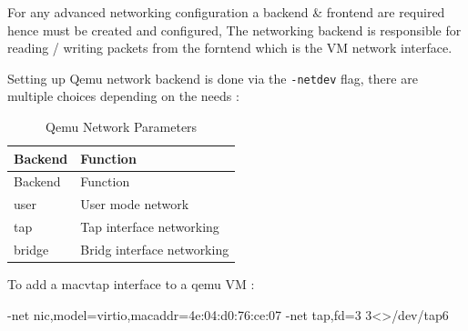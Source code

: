 \documentclass[
  14pt,
  english,
  a4paper,
]{scrreprt}
\newenvironment{Shaded}{}{}
\newcommand{\ExtensionTok}[1]{#1}
\newcommand{\NormalTok}[1]{#1}
\newcommand{\OperatorTok}[1]{\textcolor[rgb]{0.40,0.40,0.40}{#1}}
\begin{document}
For any advanced networking configuration a backend \& frontend are
required hence must be created and configured, The networking backend is
responsible for reading / writing packets from the forntend which is the
VM network interface.

Setting up Qemu network backend is done via the \texttt{-netdev} flag,
there are multiple choices depending on the needs :

\hypertarget{tbl:qemu_net_param}{}
\begin{longtable}[]{@{}ll@{}}
\caption{\label{tbl:qemu_net_param}Qemu Network
Parameters}\tabularnewline
\toprule
\begin{minipage}[b]{0.13\columnwidth}\raggedright
Backend\strut
\end{minipage} & \begin{minipage}[b]{0.38\columnwidth}\raggedright
Function\strut
\end{minipage}\tabularnewline
\midrule
\endfirsthead
\toprule
\begin{minipage}[b]{0.13\columnwidth}\raggedright
Backend\strut
\end{minipage} & \begin{minipage}[b]{0.38\columnwidth}\raggedright
Function\strut
\end{minipage}\tabularnewline
\midrule
\endhead
\begin{minipage}[t]{0.13\columnwidth}\raggedright
user\strut
\end{minipage} & \begin{minipage}[t]{0.38\columnwidth}\raggedright
User mode network\strut
\end{minipage}\tabularnewline
\begin{minipage}[t]{0.13\columnwidth}\raggedright
tap\strut
\end{minipage} & \begin{minipage}[t]{0.38\columnwidth}\raggedright
Tap interface networking\strut
\end{minipage}\tabularnewline
\begin{minipage}[t]{0.13\columnwidth}\raggedright
bridge\strut
\end{minipage} & \begin{minipage}[t]{0.38\columnwidth}\raggedright
Bridg interface networking\strut
\end{minipage}\tabularnewline
\bottomrule
\end{longtable}

To add a macvtap interface to a qemu VM :

\begin{Shaded}
\begin{Highlighting}[]
\ExtensionTok{{-}net}\NormalTok{ nic,model=virtio,macaddr=4e:04:d0:76:ce:07}
\ExtensionTok{{-}net}\NormalTok{ tap,fd=3 }\OperatorTok{3\textless{}\textgreater{}}\NormalTok{/dev/tap6}
\end{Highlighting}
\end{Shaded}
\end{document}
